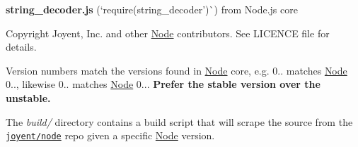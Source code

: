 {\bfseries string\+\_\+decoder.\+js} (`require(\textquotesingle{}string\+\_\+decoder')\`{}) from Node.\+js core

Copyright Joyent, Inc. and other \mbox{\hyperlink{classNode}{Node}} contributors. See L\+I\+C\+E\+N\+CE file for details.

Version numbers match the versions found in \mbox{\hyperlink{classNode}{Node}} core, e.\+g. 0.. matches \mbox{\hyperlink{classNode}{Node}} 0.., likewise 0.. matches \mbox{\hyperlink{classNode}{Node}} 0... {\bfseries Prefer the stable version over the unstable.}

The {\itshape build/} directory contains a build script that will scrape the source from the \href{https://github.com/joyent/node}{\tt joyent/node} repo given a specific \mbox{\hyperlink{classNode}{Node}} version. 